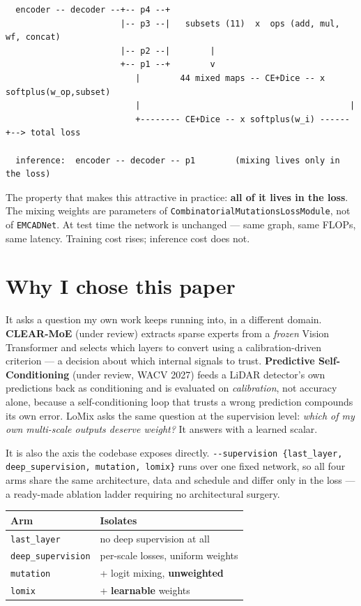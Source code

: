 \documentclass[11pt,a4paper]{article}
\newcommand{\code}[1]{\texttt{\small #1}}
\begin{document}
\begin{lstlisting}
  encoder -- decoder --+-- p4 --+
                       |-- p3 --|   subsets (11)  x  ops (add, mul, wf, concat)
                       |-- p2 --|        |
                       +-- p1 --+        v
                          |        44 mixed maps -- CE+Dice -- x softplus(w_op,subset)
                          |                                          |
                          +-------- CE+Dice -- x softplus(w_i) ------+--> total loss

  inference:  encoder -- decoder -- p1        (mixing lives only in the loss)
\end{lstlisting}

The property that makes this attractive in practice: \textbf{all of it lives in
the loss}. The mixing weights are parameters of
\code{CombinatorialMutationsLossModule}, not of \code{EMCADNet}. At test time
the network is unchanged --- same graph, same FLOPs, same latency. Training cost
rises; inference cost does not.

\section{Why I chose this paper}

It asks a question my own work keeps running into, in a different domain.
\textbf{CLEAR-MoE} (under review) extracts sparse experts from a \emph{frozen}
Vision Transformer and selects which layers to convert using a
calibration-driven criterion --- a decision about which internal signals to
trust. \textbf{Predictive Self-Conditioning} (under review, WACV 2027) feeds a
LiDAR detector's own predictions back as conditioning and is evaluated on
\emph{calibration}, not accuracy alone, because a self-conditioning loop that
trusts a wrong prediction compounds its own error. LoMix asks the same question
at the supervision level: \emph{which of my own multi-scale outputs deserve
weight?} It answers with a learned scalar.

It is also the axis the codebase exposes directly. \code{-{}-supervision
\{last\_layer, deep\_supervision, mutation, lomix\}} runs over one fixed
network, so all four arms share the same architecture, data and schedule and
differ only in the loss --- a ready-made ablation ladder requiring no
architectural surgery.

\begin{center}
\begin{tabular}{@{}ll@{}}
\toprule
\textbf{Arm} & \textbf{Isolates} \\
\midrule
\code{last\_layer} & no deep supervision at all \\
\code{deep\_supervision} & per-scale losses, uniform weights \\
\code{mutation} & + logit mixing, \textbf{unweighted} \\
\code{lomix} & + \textbf{learnable} weights \\
\bottomrule
\end{tabular}
\end{center}
\end{document}
